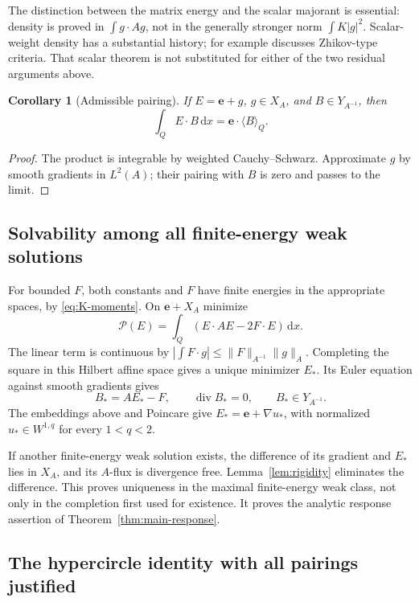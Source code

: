 \documentclass[11pt,a4paper]{article}
\numberwithin{equation}{section}
\newtheorem{corollary}[theorem]{Corollary}
\theoremstyle{definition}
\theoremstyle{remark}\newtheorem{remark}[theorem]{Remark}
\DeclareMathOperator{\diver}{div}
\newcommand{\dd}{\,\mathrm dx}
\newcommand{\mean}[2]{\langle #1\rangle_{#2}}
\newcommand{\norm}[1]{\lVert #1\rVert}
\newcommand{\cP}{\mathcal P}
\newcommand{\evec}{\boldsymbol e}
\begin{document}
The distinction between the matrix energy and the scalar majorant is
essential: density is proved in \(\int g\cdot Ag\), not in the generally
stronger norm \(\int K|g|^2\).
Scalar-weight density has a substantial history; for example
\cite[Theorem~4.1]{Ambrosio2015} discusses Zhikov-type
criteria. That scalar theorem is not substituted for either of the
two residual arguments above.

\begin{corollary}[Admissible pairing]\label{cor:pairing}
If \(E=\evec+g\), \(g\in X_A\), and \(B\in Y_{A^{-1}}\), then
\[
 \int_QE\cdot B\dd=\evec\cdot\mean BQ.
\]
\end{corollary}
\begin{proof}
The product is integrable by weighted Cauchy--Schwarz.
Approximate \(g\) by smooth gradients in \(L^2(A)\);
their pairing with \(B\) is zero and passes to the limit.
\end{proof}

\subsection{Solvability among all finite-energy weak solutions}

For bounded \(F\), both constants and \(F\) have finite energies
in the appropriate spaces, by \eqref{eq:K-moments}.
On \(\evec+X_A\) minimize
\[
 \cP(E)=\int_Q(E\cdot AE-2F\cdot E)\dd.
\]
The linear term is continuous by
\(\left|\int F\cdot g\right|\leq\norm F_{A^{-1}}\norm g_A\).
Completing the square in this Hilbert affine space gives a unique
minimizer \(E_*\).
Its Euler equation against smooth gradients gives
\[
 B_*=AE_*-F,\qquad \diver B_*=0,\qquad
 B_*\in Y_{A^{-1}}.
\]
The embeddings above and Poincare give
\(E_*=\evec+\nabla u_*\), with normalized
\(u_*\in W^{1,q}\) for every \(1<q<2\).

If another finite-energy weak solution exists, the difference of its
gradient and \(E_*\) lies in \(X_A\), and its \(A\)-flux is divergence
free. Lemma~\ref{lem:rigidity} eliminates the difference.
This proves uniqueness in the maximal finite-energy weak class, not
only in the completion first used for existence. It proves the
analytic response assertion of Theorem~\ref{thm:main-response}.

\subsection{The hypercircle identity with all pairings justified}
\end{document}
